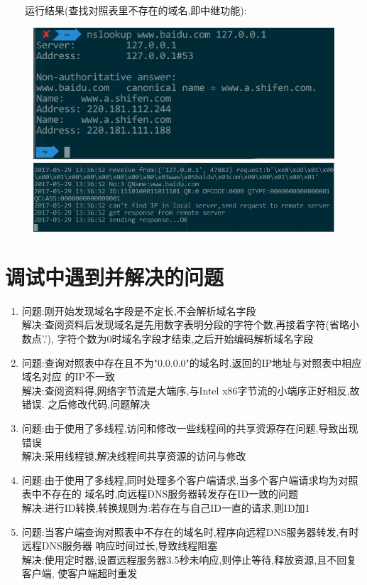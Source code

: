 \documentclass{ctexart}
\begin{document}
\ \ \ \ 运行结果(查找对照表里不存在的域名,即中继功能):
\begin{figure}[H]
  \centering
  \includegraphics[width=15cm]{img/debug-level-2-remote-result.png}
  \includegraphics[width=15cm]{img/debug-level-2-remote.png}
\end{figure}

\pagebreak[4]

\section{调试中遇到并解决的问题}
\label{question}
\begin{enumerate}
    \item 问题:刚开始发现域名字段是不定长,不会解析域名字段\\
          解决:查阅资料后发现域名是先用数字表明分段的字符个数,再接着字符(省略小数点'.'),
          字符个数为0时域名字段才结束,之后开始编码解析域名字段
    \item 问题:查询对照表中存在且不为"0.0.0.0"的域名时,返回的IP地址与对照表中相应域名对应
          的IP不一致\\
          解决:查阅资料得,网络字节流是大端序,与Intel x86字节流的小端序正好相反,故错误.
          之后修改代码,问题解决
    \item 问题:由于使用了多线程,访问和修改一些线程间的共享资源存在问题,导致出现错误\\
          解决:采用线程锁,解决线程间共享资源的访问与修改
    \item 问题:由于使用了多线程,同时处理多个客户端请求,当多个客户端请求均为对照表中不存在的
          域名时,向远程DNS服务器转发存在ID一致的问题\\
          解决:进行ID转换,转换规则为:若存在与自己ID一直的请求,则ID加1
    \item 问题:当客户端查询对照表中不存在的域名时,程序向远程DNS服务器转发,有时远程DNS服务器
          响应时间过长,导致线程阻塞\\
          解决:使用定时器,设置远程服务器3.5秒未响应,则停止等待,释放资源,且不回复客户端,
          使客户端超时重发
\end{enumerate}
\end{document}
